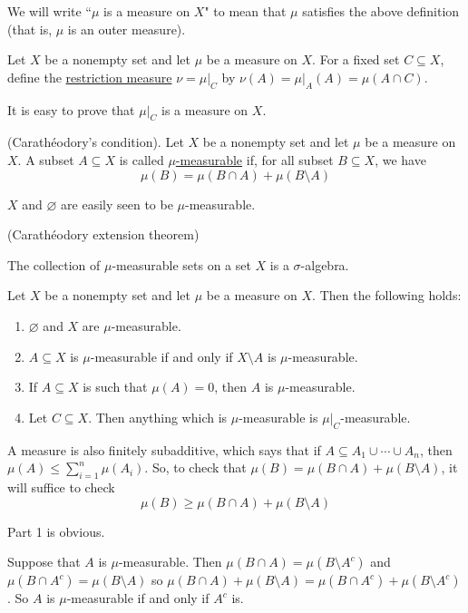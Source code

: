 \documentclass[x11names,reqno,14pt]{extarticle}
\begin{document}
We will write ``$\mu$ is a measure on $X$" to mean that $\mu$ satisfies the above definition (that is, $\mu$ is an outer measure).


Let $X$ be a nonempty set and let $\mu$ be a measure on $X$. For a fixed set $C\subseteq X$, define the \underline{restriction measure} $\nu = \mu|_C$ by $\nu(A) = \mu|_A(A) = \mu(A\cap C)$.

\rem It is easy to prove that $\mu|_C$ is a measure on $X$. 

 (Carath\'eodory's condition). Let $X$ be a nonempty set and let $\mu$ be a measure on $X$. A subset $A\subseteq X$ is called \underline{$\mu$-measurable} if, for all subset $B\subseteq X$, we have
\[
\mu(B) = \mu(B \cap A) + \mu(B \setminus A)
\]

\rem $X$ and $\varnothing$ are easily seen to be $\mu$-measurable. 

\thm (Carath\'eodory extension theorem)

The collection of $\mu$-measurable sets on a set $X$ is a $\sigma$-algebra.

\thm Let $X$ be a nonempty set and let $\mu$ be a measure on $X$. Then the following holds: 

\begin{enumerate}
\item $\varnothing$ and $X$ are $\mu$-measurable.
\item $A \subseteq X$ is $\mu$-measurable if and only if $X \setminus A$ is $\mu$-measurable.
\item If $A\subseteq X$ is such that $\mu(A) = 0$, then $A$ is $\mu$-measurable. 
\item Let $C \subseteq X$. Then anything which is $\mu$-measurable is $\mu|_C$-measurable. 
\end{enumerate}

\rem

A measure is also finitely subadditive, which says that if $A \subseteq A_1 \cup \cdots \cup A_n$, then $\mu(A) \leq \sum_{i=1}^n\mu(A_i)$. So, to check that $\mu(B) = \mu(B \cap A) + \mu(B\setminus A)$, it will suffice to check
\[
\mu(B)\geq\mu(B\cap A) + \mu(B\setminus A)
\]

\proof

Part 1 is obvious. 

Suppose that $A$ is $\mu$-measurable. Then $\mu(B\cap A) = \mu(B \setminus A^c)$ and $\mu(B\cap A^c) = \mu(B\setminus A)$ so $\mu(B \cap A) + \mu(B\setminus A) = \mu(B \cap A^c) + \mu(B\setminus A^c)$. So $A$ is $\mu$-measurable if and only if $A^c$ is.
\end{document}

